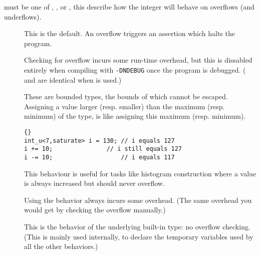  must be one of , %
, or , this describe how the integer will
behave on overflows (and underflows).

\begin{description}

\item[]

This is the default.  An overflow triggers an assertion which halts
the program.

Checking for overflow incurs some run-time overhead, but this is
dissabled entirely when compiling with \texttt{-DNDEBUG} once the
program is debugged.  ( and  are identical
when  is used.)


\item[]

These are bounded types, the bounds of which cannot be escaped.
Assigning a value larger (resp. smaller) than the maximum
(resp. minimum) of the type, is like assigning this maximum
(resp. minimum).

\begin{lstlisting}{}
int_u<7,saturate> i = 130; // i equals 127
i += 10;	           // i still equals 127
i -= 10;                   // i equals 117
\end{lstlisting}

This behaviour is useful for tasks like histogram construction where a
value is always increased but should never overflow.

Using the  behavior always incurs some overhead.
(The same overhead you would get by checking the overflow manually.)

\item[]
This is the behavior of the underlying built-in type: no overflow
checking.  (This is mainly used internally, to declare the temporary
variables used by all the other behaviors.)

\end{description}

